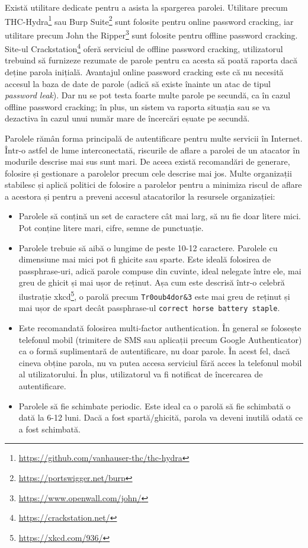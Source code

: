 Există utilitare dedicate pentru a asista la spargerea parolei. Utilitare precum THC-Hydra\footnote{\url{https://github.com/vanhauser-thc/thc-hydra}} sau Burp Suite\footnote{\url{https://portswigger.net/burp}} sunt folosite pentru online password cracking, iar utilitare precum John the Ripper\footnote{\url{https://www.openwall.com/john/}} sunt folosite pentru offline password cracking. Site-ul Crackstation\footnote{\url{https://crackstation.net/}} oferă serviciul de offline password cracking, utilizatorul trebuind să furnizeze rezumate de parole pentru ca acesta să poată raporta dacă deține parola inițială. Avantajul online password cracking este că nu necesită accesul la baza de date de parole (adică să existe înainte un atac de tipul \textit{password leak}). Dar nu se pot testa foarte multe parole pe secundă, ca în cazul offline password cracking; în plus, un sistem va raporta situația sau se va dezactiva în cazul unui număr mare de încercări eșuate pe secundă.

Parolele rămân forma principală de autentificare pentru multe servicii în Internet. Într-o astfel de lume interconectată, riscurile de aflare a parolei de un atacator în modurile descrise mai sus sunt mari. De aceea există recomandări de generare, folosire și gestionare a parolelor precum cele descrise mai jos. Multe organizații stabilesc și aplică politici de folosire a parolelor pentru a minimiza riscul de aflare a acestora și pentru a preveni accesul atacatorilor la resursele organizației:

\begin{itemize}
  \item Parolele să conțină un set de caractere cât mai larg, să nu fie doar litere mici. Pot conține litere mari, cifre, semne de punctuație.
  \item Parolele trebuie să aibă o lungime de peste 10-12 caractere. Parolele cu dimensiune mai mici pot fi ghicite sau sparte. Este ideală folosirea de passphrase-uri, adică parole compuse din cuvinte, ideal nelegate între ele, mai greu de ghicit și mai ușor de reținut. Așa cum este descrisă într-o celebră ilustrație xkcd\footnote{\url{https://xkcd.com/936/}}, o parolă precum \texttt{Tr0oub4dor\&3} este mai greu de reținut și mai ușor de spart decât passphrase-ul \texttt{correct horse battery staple}.
  \item Este recomandată folosirea multi-factor authentication. În general se folosește telefonul mobil (trimitere de SMS sau aplicații precum Google Authenticator) ca o formă suplimentară de autentificare, nu doar parole. În acest fel, dacă cineva obține parola, nu va putea accesa serviciul fără acces la telefonul mobil al utilizatorului. În plus, utilizatorul va fi notificat de încercarea de autentificare.
  \item Parolele să fie schimbate periodic. Este ideal ca o parolă să fie schimbată o dată la 6-12 luni. Dacă a fost spartă/ghicită, parola va deveni inutilă odată ce a fost schimbată.
\end{itemize}

